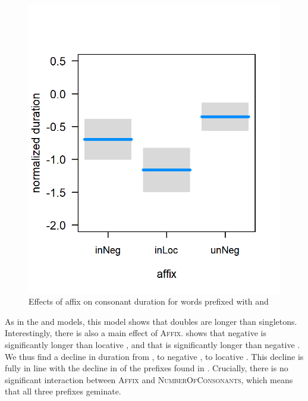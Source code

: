 \begin{figure}
	
	
	\includegraphics[scale=0.8] {images/Corpus/unInModel.png}
	\caption{Effects of  affix on consonant duration for words prefixed with  and }
	\label{fig:inUnModel}
\end{figure}



As in the  and models, this model shows that doubles are longer than singletons. Interestingly, there is also  a  main effect of \textsc{Affix}.  shows that negative  is significantly longer than locative , and that  is significantly longer than negative .  We thus find a decline in duration from , to negative , to locative . This decline is fully in line with the decline in  of the prefixes found in . Crucially, there is no significant interaction between \textsc{Affix} and \textsc{NumberOfConsonants}, which means that all three prefixes geminate.

